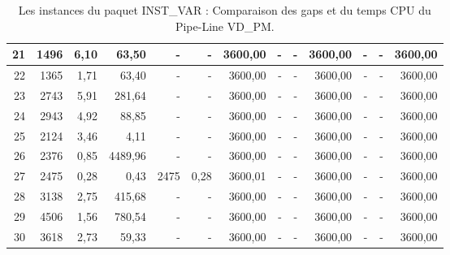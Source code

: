 \begin{table}[H]
\begin{tabular}{|r|rrr|rrr|rrr|rrr|}
21	&	1496	&	6,10	&	63,50	&	-	&	-	&	3600,00	&	-	&	-	&	3600,00	&	-	&	-	&	3600,00	\\ \hline
22	&	1365	&	1,71	&	63,40	&	-	&	-	&	3600,00	&	-	&	-	&	3600,00	&	-	&	-	&	3600,00	\\ \hline
23	&	2743	&	5,91	&	281,64	&	-	&	-	&	3600,00	&	-	&	-	&	3600,00	&	-	&	-	&	3600,00	\\ \hline
24	&	2943	&	4,92	&	88,85	&	-	&	-	&	3600,00	&	-	&	-	&	3600,00	&	-	&	-	&	3600,00	\\ \hline
25	&	2124	&	3,46	&	4,11	&	-	&	-	&	3600,00	&	-	&	-	&	3600,00	&	-	&	-	&	3600,00	\\ \hline
26	&	2376	&	0,85	&	4489,96	&	-	&	-	&	3600,00	&	-	&	-	&	3600,00	&	-	&	-	&	3600,00	\\ \hline
27	&	2475	&	0,28	&	0,43	&	2475	&	0,28	&	3600,01	&	-	&	-	&	3600,00	&	-	&	-	&	3600,00	\\ \hline
28	&	3138	&	2,75	&	415,68	&	-	&	-	&	3600,00	&	-	&	-	&	3600,00	&	-	&	-	&	3600,00	\\ \hline
29	&	4506	&	1,56	&	780,54	&	-	&	-	&	3600,00	&	-	&	-	&	3600,00	&	-	&	-	&	3600,00	\\ \hline
30	&	3618	&	2,73	&	59,33	&	-	&	-	&	3600,00	&	-	&	-	&	3600,00	&	-	&	-	&	3600,00	\\ \hline

		
		\bottomrule
	\end{tabular}%
	\caption{Les instances du paquet INST\_VAR : Comparaison des gaps et du temps CPU du Pipe-Line VD\_PM.}
	
	\label{Comparaison_DPS-SMEPC_greed22}%
\end{table}%
